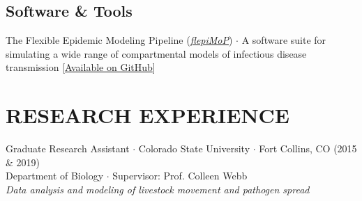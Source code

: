 \documentclass{cv}
\begin{document}





\subsection*{Software \& Tools}

The Flexible Epidemic Modeling Pipeline (\href{https://www.flepimop.org/}{\textit{flepiMoP}}) $\cdot$ A software suite for simulating a wide range of compartmental models of infectious disease transmission [\href{https://github.com/HopkinsIDD/flepiMoP}{Available on GitHub}]


\section*{RESEARCH EXPERIENCE}

Graduate Research Assistant $\cdot$ Colorado State University $\cdot$ Fort Collins, CO (2015 \& 2019) \\
Department of Biology $\cdot$ Supervisor: Prof. Colleen Webb \\
\textit{Data analysis and modeling of livestock movement and pathogen spread}
\end{document}
